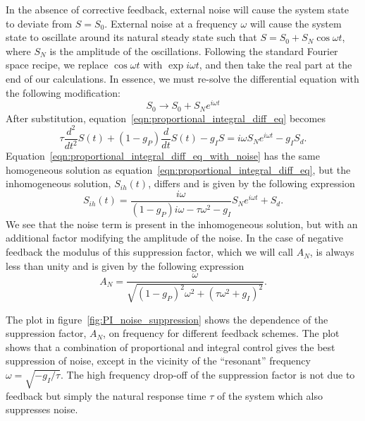 \documentclass{article}
\begin{document}
In the absence of corrective feedback, external noise will cause the system state to deviate from $S = S_0$. External noise at a frequency $\omega$ will cause the system state to oscillate around its natural steady state such that $S = S_0 + S_N \cos\omega t$, where $S_N$ is the amplitude of the oscillations. Following the standard Fourier space recipe, we replace $\cos\omega t$ with $\exp i\omega t$, and then take the real part at the end of our calculations. In essence, we must re-solve the differential equation with the following modification:
\begin{equation}
S_0 \to S_0 + S_N e^{i\omega t}
\end{equation}
After substitution, equation~\ref{eqn:proportional_integral_diff_eq} becomes
\begin{equation}
\tau \frac{d^2}{dt^2} S(t) + (1 - g_P) \frac{d}{dt} S(t) - g_I S = i\omega S_N e^{i\omega t} - g_I S_d. \label{eqn:proportional_integral_diff_eq_with_noise}
\end{equation}
Equation~\ref{eqn:proportional_integral_diff_eq_with_noise} has the same homogeneous solution as equation~\ref{eqn:proportional_integral_diff_eq}, but the inhomogeneous solution, $S_{ih}(t)$, differs and is given by the following expression
\begin{equation}
S_{ih}(t) = \frac{i\omega}{(1 - g_P) i\omega - \tau \omega^2 - g_I} S_N  e^{i\omega t} + S_d.
\end{equation}
We see that the noise term is present in the inhomogeneous solution, but with an additional factor modifying the amplitude of the noise. In the case of negative feedback the modulus of this suppression factor, which we will call $A_N$, is always less than unity and is given by the following expression
\begin{equation}
A_N = \frac{\omega}{\sqrt{(1 - g_P)^2 \omega^2 + (\tau \omega^2 + g_I)^2}}.
\end{equation}

The plot in figure~\ref{fig:PI_noise_suppression} shows the dependence of the suppression factor, $A_N$, on frequency for different feedback schemes. The plot shows that a combination of proportional and integral control gives the best suppression of noise, except in the vicinity of the ``resonant'' frequency $\omega = \sqrt{-g_I/\tau}$. The high frequency drop-off of the suppression factor is not due to feedback but simply the natural response time $\tau$ of the system which also suppresses noise.
\end{document}
